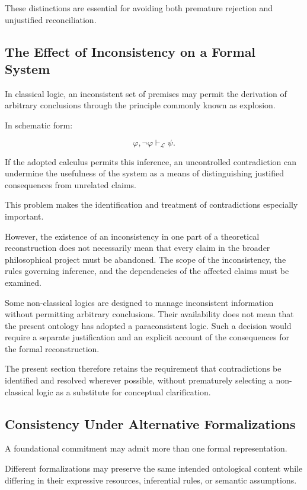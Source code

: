 These distinctions are essential for avoiding both
premature rejection and unjustified reconciliation.

\subsection{The Effect of Inconsistency on a Formal System}

In classical logic, an inconsistent set of premises may
permit the derivation of arbitrary conclusions through
the principle commonly known as explosion.

In schematic form:

\[
    \varphi,\neg\varphi \vdash_{\mathcal{L}} \psi.
\]

If the adopted calculus permits this inference, an
uncontrolled contradiction can undermine the usefulness
of the system as a means of distinguishing justified
consequences from unrelated claims.

This problem makes the identification and treatment
of contradictions especially important.

However, the existence of an inconsistency in one part
of a theoretical reconstruction does not necessarily
mean that every claim in the broader philosophical
project must be abandoned. The scope of the inconsistency,
the rules governing inference, and the dependencies
of the affected claims must be examined.

Some non-classical logics are designed to manage
inconsistent information without permitting arbitrary
conclusions. Their availability does not mean that the
present ontology has adopted a paraconsistent logic.
Such a decision would require a separate justification
and an explicit account of the consequences for the
formal reconstruction.

The present section therefore retains the requirement
that contradictions be identified and resolved wherever
possible, without prematurely selecting a non-classical
logic as a substitute for conceptual clarification.

\subsection{Consistency Under Alternative Formalizations}

A foundational commitment may admit more than one formal
representation.

Different formalizations may preserve the same intended
ontological content while differing in their expressive
resources, inferential rules, or semantic assumptions.

